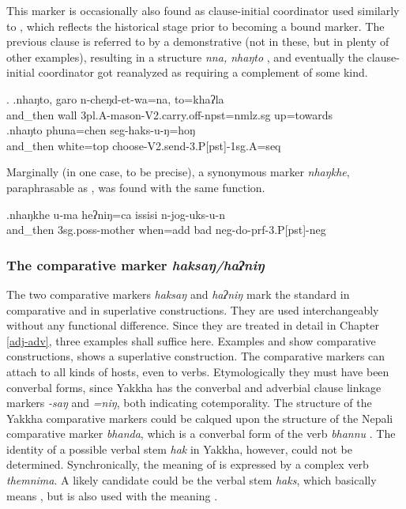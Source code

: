 This marker is occasionally also found as clause-initial coordinator used similarly to \Next, which reflects the historical stage prior to becoming a bound marker.  The previous clause is referred to by a demonstrative (not in these, but in plenty of other examples), resulting in a structure \emph{nna, nhaŋto} , and eventually  the clause-initial coordinator got reanalyzed as requiring a complement of some kind.

\ex. \ag.nhaŋto, garo n-cheŋd-et-wa=na,                            to=khaʔla\\
and\_then wall {\sc 3pl.A-}mason{\sc -V2.carry.off-npst=nmlz.sg} up=towards\\
 
\bg.nhaŋto phuna=chen            seg-haks-u-ŋ=hoŋ\\
and\_then white{\sc =top} choose{\sc -V2.send-3.P[pst]-1sg.A=seq}\\

Marginally (in one case, to be precise),  a synonymous marker \emph{nhaŋkhe}, paraphrasable as , was found with the same function.

\exg.nhaŋkhe        u-ma              heʔniŋ=ca        issisi n-jog-uks-u-n\\
and\_then {\sc 3sg.poss-}mother when{\sc =add} bad {\sc neg-}do{\sc -prf-3.P[pst]-neg}\\
 

\subsubsection{The comparative marker \emph{haksaŋ/haʔniŋ}}
  
  The two comparative markers \emph{haksaŋ} and \emph{haʔniŋ} mark the standard in comparative and in superlative constructions. They are used interchangeably without any functional difference. Since they are treated in detail in Chapter \ref{adj-adv}, three examples shall suffice here. Examples \Next[a] and \Next[b] show comparative constructions, \Next[c] shows a superlative construction. The comparative markers can attach to all kinds of hosts, even to verbs. Etymologically they must have been converbal forms, since Yakkha has the converbal and adverbial clause linkage markers \emph{-saŋ} and \emph{=niŋ}, both indicating cotemporality. The structure of the Yakkha comparative markers could be calqued upon the structure of the  Nepali comparative marker \emph{bhanda}, which is a converbal form of the verb \emph{bhannu} . The identity of a possible verbal stem \emph{hak} in Yakkha, however, could not be determined. Synchronically, the meaning of  is expressed by a complex verb \emph{themnima}. A likely candidate could be the verbal stem \emph{haks}, which basically means , but is also used with the meaning .
  
